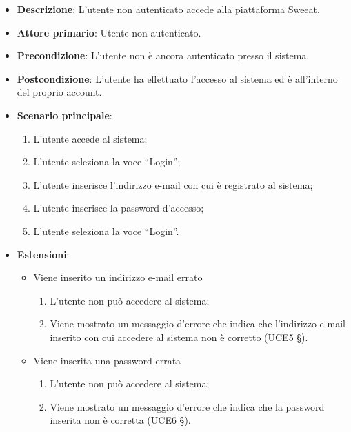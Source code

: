 \begin{itemize}
\item \textbf{Descrizione}: L'utente non autenticato accede alla piattaforma Sweeat.
\item \textbf{Attore primario}: Utente non autenticato.
\item \textbf{Precondizione}: L'utente non è ancora autenticato presso il sistema.
\item \textbf{Postcondizione}: L’utente ha effettuato l’accesso al sistema ed è all’interno del proprio account.

\item \textbf{Scenario principale}:
\begin{enumerate}
\item L’utente accede al sistema;
\item L’utente seleziona la voce “Login”;
\item L’utente inserisce l’indirizzo e-mail con cui è registrato al sistema;
\item L’utente inserisce la password d’accesso; 
\item L’utente seleziona la voce “Login”. 
\end{enumerate}

\item \textbf{Estensioni}:
\begin{itemize}
\item Viene inserito un indirizzo e-mail errato 
\begin{enumerate}
	\item L’utente non può accedere al sistema;
	\item Viene mostrato un messaggio d’errore che indica che l'indirizzo e-mail inserito con cui accedere al sistema non è corretto (UCE5 §). 
\end{enumerate}
\item Viene inserita una password errata
\begin{enumerate}
	\item L’utente non può accedere al sistema;
	\item Viene mostrato un messaggio d’errore che indica che la password inserita non è corretta (UCE6 §).
\end{enumerate}
\end{itemize}
\end{itemize}